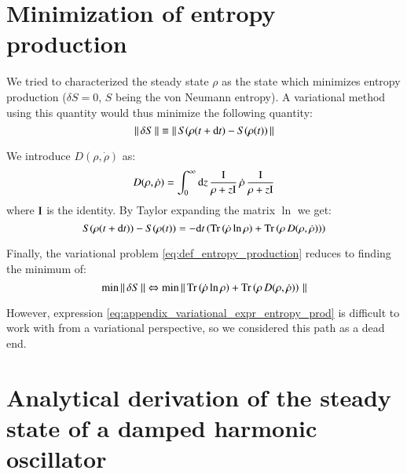 %
%

\section{Minimization of entropy production}
\label{appendix:min_entropy_production}

\newcommand{\dd}[1]{\ensuremath{{\rm d}#1}}

\newcommand{\id}{\ensuremath{{\rm I}}}

We tried to characterized the steady state $\rho$ as the state which minimizes entropy production ($\delta S = 0$, $S$ being the von Neumann entropy). A variational method using this quantity would thus minimize the following quantity:
\begin{equation}
\label{eq:def_entropy_production}
\norm{\delta S} \equiv \norm{S(\rho(t+\dd{t}) - S(\rho(t))}
\end{equation}

We introduce $D(\rho, \dot \rho)$ as: 
\begin{equation}
    D(\rho, \dot \rho) = \int_0^\infty \dd{z} \, \frac{\id}{\rho + z \id} \, \dot \rho \, \frac{\id}{\rho + z \id}
\end{equation}
where $\id$ is the identity. By Taylor expanding the matrix $\ln$ \cite{adlertaylor} we get:
\begin{equation*}
    S(\rho(t + \dd{t})) - S(\rho(t)) = - \dd{t} \left( \trace{\dot \rho \ln{\rho}} + \trace{\rho \, D(\rho, \dot \rho)} \right)
\end{equation*}

Finally, the variational problem \ref{eq:def_entropy_production} reduces to finding the minimum of:
\begin{equation}
\label{eq:appendix_variational_expr_entropy_prod}
    \min \vert\vert\, \delta S \,\vert\vert \Leftrightarrow  \min \vert\vert\,  \mathrm{Tr}\left( \dot \rho \ln{\rho} \right) + \mathrm{Tr}\left( \rho \, D(\rho, \dot \rho) \right)  \,\vert\vert
\end{equation}

However, expression \ref{eq:appendix_variational_expr_entropy_prod} is difficult to work with from a variational perspective, so we considered this path as a dead end.


%
%




\section{Analytical derivation of the steady state of a damped harmonic oscillator}
\label{appendix:analytics_toy_model}

